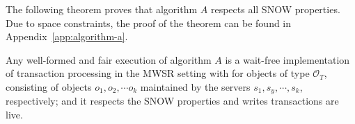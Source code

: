 The following theorem proves that algorithm $A$ respects all SNOW properties. Due to space constraints, the proof of the theorem can be found in Appendix~\ref{app:algorithm-a}. %



\begin{theorem} Any well-formed  and fair execution of algorithm $A$ is a wait-free implementation of  transaction processing in the MWSR setting with for objects of type $\mathcal{O}_T$, consisting of  objects $o_1, o_2, \cdots o_k$ maintained by the  servers $s_1, s_y, \cdots, s_k$, respectively; and it respects the SNOW properties and {\sc write}s transactions are live.
	\end{theorem}
	

